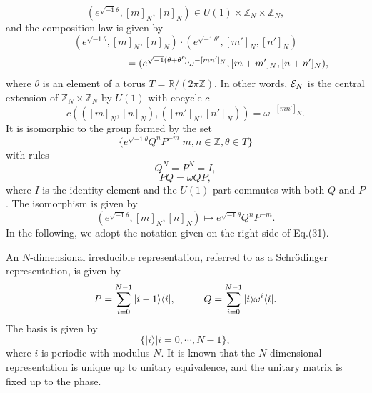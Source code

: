 \documentclass[12pt]{iopart}
\begin{document}
\begin{equation}
(e^{\sqrt{-1}\theta},[m]_N,[n]_N)\in U(1)\times\mathbb Z_N\times\mathbb Z_N,
\end{equation}
and the composition law is given by
\[
(e^{\sqrt{-1}\theta},[m]_N,[n]_N)\cdot(e^{\sqrt{-1}\theta'},[m']_N,[n']_N)
\]
\begin{equation}
\hspace{30mm}
=
(e^{\sqrt{-1}(\theta+\theta')}\omega^{-[mn']_N},[m+m']_N,[n+n']_N),
\end{equation}
where \(\theta\) is an element of a torus \(T=\mathbb R/(2\pi\mathbb Z)\).
%
In other words, \({\cal E}_N\) is the central extension of \(\mathbb Z_N\times\mathbb Z_N\)
by \(U(1)\) with cocycle \(c\)
\begin{equation}
c(([m]_N,[n]_N),([m']_N,[n']_N))=\omega^{-[mn']_N}.
\end{equation}
%
It is isomorphic to the group formed by the set
\begin{equation}
\{e^{\sqrt{-1}\theta}Q^nP^{-m}|m,n\in\mathbb Z,\theta\in T\}
\end{equation}
with rules
\begin{equation}
Q^N=P^N=I,
\label{qp-definition-cyclicity}
\end{equation}
\begin{equation}
PQ=\omega QP,
\label{qp-definition-commutativity}
\end{equation}
where \(I\) is the identity element and
the \(U(1)\) part commutes with both \(Q\) and \(P\).
%
%
The isomorphism is given by
\begin{equation}
(e^{\sqrt{-1}\theta},[m]_N,[n]_N)\mapsto e^{\sqrt{-1}\theta}Q^nP^{-m}.
\end{equation}
%
In the following, we adopt the notation given on the right side of Eq.(31).

An \(N\)-dimensional irreducible representation, referred to as a Schr\"odinger representation,
is given by
\begin{equation}
P=\sum_{i=0}^{N-1}|i-1\rangle\langle i|,
\hspace{10mm}
Q=\sum_{i=0}^{N-1}|i\rangle\omega^i\langle i|.
\end{equation}
%
The basis is given by
\begin{equation}
\{|i\rangle|i=0,\cdots,N-1\},
\end{equation}
where \(i\) is periodic with modulus \(N\).
It is known that the \(N\)-dimensional representation is unique up to unitary equivalence,
and the unitary matrix is fixed up to the phase.
\end{document}
